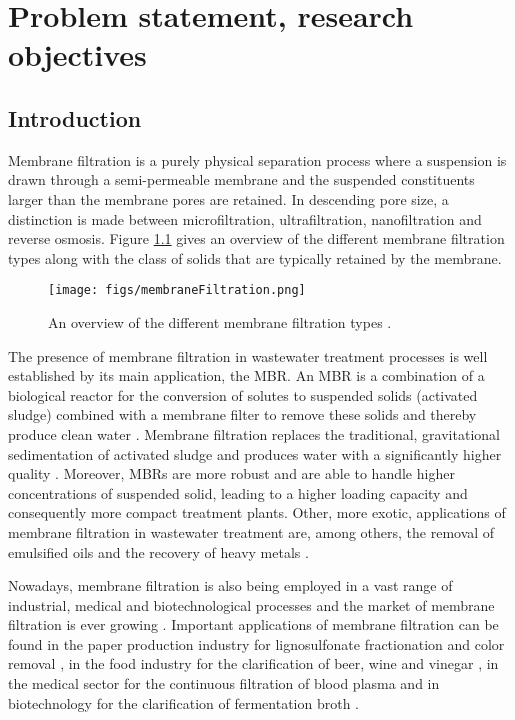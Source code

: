 \chapter[Introduction]%
{Problem statement, research objectives}%

\section{Introduction}
Membrane filtration is a purely physical separation process where a suspension is drawn through a semi-permeable membrane and the suspended constituents larger than the membrane pores are retained. In descending pore size, a distinction is made between microfiltration, ultrafiltration, nanofiltration and reverse osmosis. Figure \ref{fig:memFilt} gives an overview of the different membrane filtration types along with the class of solids that are typically retained by the membrane.\par
\begin{figure}[H]
 \centering
 \texttt{[image: figs/membraneFiltration.png]}
 \caption{An overview of the different membrane filtration types \citep{Luque2008}. \label{fig:memFilt}}
\end{figure}
The presence of membrane filtration in wastewater treatment processes is well established by its main application, the \gls{MBR}.
An \gls{MBR} is a combination of a biological reactor for the conversion of solutes to suspended solids (activated sludge) combined with a membrane filter to remove these solids and thereby produce clean water \citep{MBRBook}. Membrane filtration replaces the traditional, gravitational sedimentation of activated sludge and produces water with a significantly higher quality \citep{Judd2008}. Moreover, \gls{MBR}s are more robust and are able to handle higher concentrations of suspended solid, leading to a higher loading capacity and consequently more compact treatment plants. Other, more exotic, applications of membrane filtration in wastewater treatment are, among others, the removal of emulsified oils and the recovery of heavy metals \citep{Fu2011,Cheryan1998}. \par
Nowadays, membrane filtration is also being employed in a vast range of industrial, medical and biotechnological processes and the market of membrane filtration is ever growing \citep{BOEKCFMMarket,Luque2008}. %
Important applications of membrane filtration can be found in the paper production industry for lignosulfonate fractionation and color removal \citep{Luque2008}, in the food industry for the clarification of beer, wine and vinegar \citep{Cimini2013,Ulbricht2009,adnan2012}, in the medical sector for the continuous filtration of blood plasma and in biotechnology for the clarification  of fermentation broth \citep{Homsy2012,dsp}.
